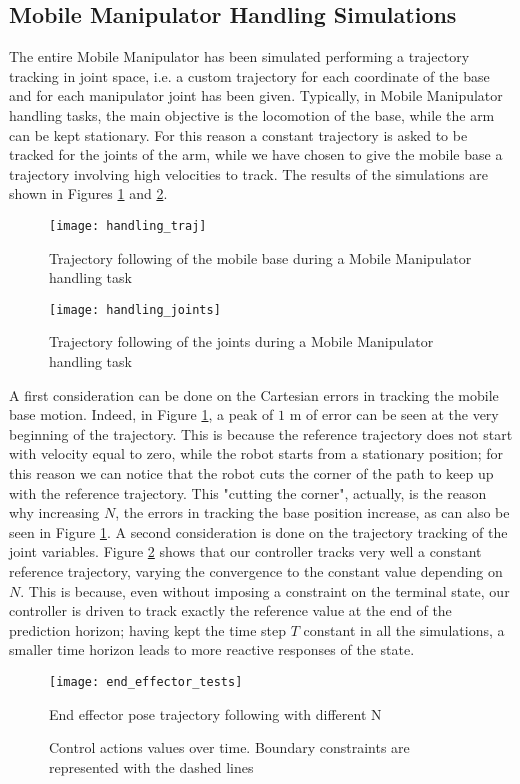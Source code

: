 \subsection{Mobile Manipulator Handling Simulations}
The entire Mobile Manipulator has been simulated performing a trajectory tracking in joint space, i.e. a custom trajectory for each coordinate of the base and for each manipulator joint has been given. Typically, in Mobile Manipulator handling tasks, the main objective is the locomotion of the base, while the arm can be kept stationary. For this reason a constant trajectory is asked to be tracked for the joints of the arm, while we have chosen to give the mobile base a trajectory involving high velocities to track. The results of the simulations are shown in Figures \ref{handling_traj} and \ref{handling_joints}. 
\begin{figure}[p]
	\centering
	\texttt{[image: handling\_traj]}
	\caption{Trajectory following of the mobile base during a Mobile Manipulator handling task}
	\label{handling_traj}
\end{figure}
\begin{figure}[p]
	\centering
	\texttt{[image: handling\_joints]}
	\caption{Trajectory following of the joints during a Mobile Manipulator handling task}
	\label{handling_joints}
\end{figure}
A first consideration can be done on the Cartesian errors in tracking the mobile base motion. Indeed, in Figure \ref{handling_traj}, a peak of $1$ m of error can be seen at the very beginning of the trajectory. This is because the reference trajectory does not start with velocity equal to zero, while the robot starts from a stationary position; for this reason we can notice that the robot cuts the corner of the path to keep up with the reference trajectory. This "cutting the corner", actually, is the reason why increasing $N$, the errors in tracking the base position increase, as can also be seen in Figure \ref{handling_traj}. A second consideration is done on the trajectory tracking of the joint variables. Figure \ref{handling_joints} shows that our controller tracks very well a constant reference trajectory, varying the convergence to the constant value depending on $N$. This is because, even without imposing a constraint on the terminal state, our controller is driven to track exactly the reference value at the end of the prediction horizon; having kept the time step $T$ constant in all the simulations, a smaller time horizon leads to more reactive responses of the state.
\begin{figure}[p]
	\centering
	\texttt{[image: end\_effector\_tests]}
	\caption{End effector pose trajectory following with different N }
	\label{end_effector_tests}
\end{figure}
\begin{figure}[p]
	\centering
	\caption{Control actions values over time. Boundary constraints are represented with the dashed lines}
	\label{control_actions_SIM}
\end{figure}
